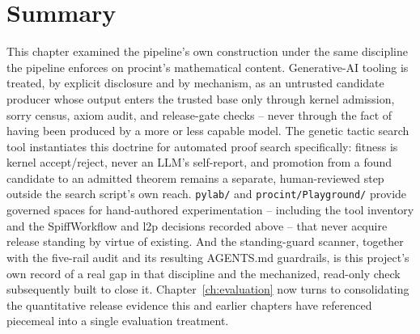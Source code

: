\section{Summary}

This chapter examined the pipeline's own construction under the same
discipline the pipeline enforces on \textsf{procint}'s mathematical
content. Generative-AI tooling is treated, by explicit disclosure and by
mechanism, as an untrusted candidate producer whose output enters the
trusted base only through kernel admission, sorry census, axiom audit,
and release-gate checks -- never through the fact of having been
produced by a more or less capable model. The genetic tactic search tool
instantiates this doctrine for automated proof search specifically:
fitness is kernel accept/reject, never an LLM's self-report, and
promotion from a found candidate to an admitted theorem remains a
separate, human-reviewed step outside the search script's own reach.
\texttt{pylab/} and \texttt{procint/Playground/} provide governed spaces
for hand-authored experimentation -- including the tool inventory and
the SpiffWorkflow and l2p decisions recorded above -- that never acquire
release standing by virtue of existing. And the standing-guard scanner,
together with the five-rail audit and its resulting AGENTS.md guardrails,
is this project's own record of a real gap in that discipline and the
mechanized, read-only check subsequently built to close it. Chapter~\ref{ch:evaluation}
now turns to consolidating the quantitative release evidence this and
earlier chapters have referenced piecemeal into a single evaluation
treatment.
